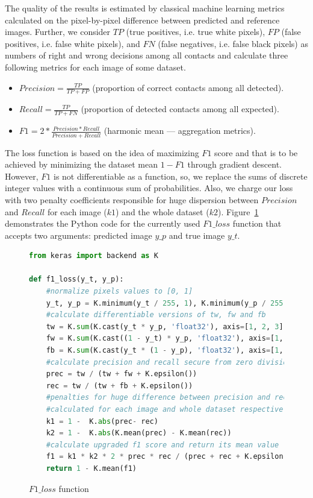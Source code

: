 The quality of the results is estimated by classical machine learning metrics calculated on the pixel-by-pixel difference between predicted and reference images. Further, we consider $TP$ (true positives, i.e. true white pixels), $FP$ (false positives, i.e. false white pixels), and $FN$ (false negatives, i.e. false black pixels) as numbers of right and wrong decisions among all contacts and calculate three following metrics for each image of some dataset. 

\begin{itemize} 
    \item $Precision = \displaystyle \frac{TP}{TP + FP}$ (proportion of correct contacts among all detected).
    \item $Recall = \displaystyle \frac{TP}{TP + FN}$ (proportion of detected contacts among all expected).
    \item $F1 = \displaystyle 2 * \frac{Precision * Recall}{Precision + Recall}$ (harmonic mean --- aggregation metrics).
\end{itemize}

The loss function is based on the idea of maximizing $F1$ score and that is to be achieved by minimizing the dataset mean $1 - F1$ through gradient descent. However, $F1$ is not differentiable as a function, so, we replace the sums of discrete integer values with a continuous sum of probabilities. Also, we charge our loss with two penalty coefficients responsible for huge dispersion between $Precision$ and $Recall$ for each image ($k1$) and the whole dataset ($k2$). Figure~\ref{loss} demonstrates the Python code for the currently used  $F1\_loss$ function that accepts two arguments: predicted image $y\_p$ and true image $y\_t$.

\begin{figure}[h]
\centering
\begin{lstlisting}[language=Python]
from keras import backend as K

def f1_loss(y_t, y_p):
    #normalize pixels values to [0, 1]
    y_t, y_p = K.minimum(y_t / 255, 1), K.minimum(y_p / 255, 1)
    #calculate differentiable versions of tw, fw and fb
    tw = K.sum(K.cast(y_t * y_p, 'float32'), axis=[1, 2, 3])
    fw = K.sum(K.cast((1 - y_t) * y_p, 'float32'), axis=[1, 2, 3])
    fb = K.sum(K.cast(y_t * (1 - y_p), 'float32'), axis=[1, 2, 3])
    #calculate precision and recall secure from zero division error
    prec = tw / (tw + fw + K.epsilon())
    rec = tw / (tw + fb + K.epsilon())
    #penalties for huge difference between precision and recall 
    #calculated for each image and whole dataset respectively
    k1 = 1 -  K.abs(prec- rec)
    k2 = 1 -  K.abs(K.mean(prec) - K.mean(rec))
    #calculate upgraded f1 score and return its mean value
    f1 = k1 * k2 * 2 * prec * rec / (prec + rec + K.epsilon()) 
    return 1 - K.mean(f1)
\end{lstlisting}
\caption{$F1\_loss$ function}
\label{loss}
\end{figure} 

